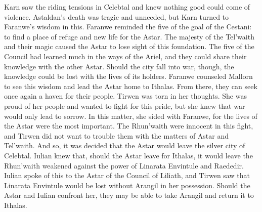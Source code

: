 \documentclass[smalldemyvopaper,11pt,twoside,onecolumn,openright,extrafontsizes]{memoir}
\begin{document}
{{Karn saw the riding tensions in Celebtal and knew nothing good could come of violence. Astaldan’s death was tragic and unneeded, but Karn turned to Faranwe’s wisdom in this. Faranwe reminded the five of the goal of the Cestani: to find a place of refuge and new life for the Astar. The majesty of the Tel’waith and their magic caused the Astar to lose sight of this foundation. The five of the Council had learned much in the ways of the Ariel, and they could share their knowledge with the other Astar. Should the city fall into war, though, the knowledge could be lost with the lives of its holders. Faranwe counseled Mallorn to see this wisdom and lead the Astar home to Ithalas. From there, they can seek once again a haven for their people.
Tirwen was torn in her thoughts. She was proud of her people and wanted to fight for this pride, but she knew that war would only lead to sorrow. In this matter, she sided with Faranwe, for the lives of the Astar were the most important. The Rhun’waith were innocent in this fight, and Tirwen did not want to trouble them with the matters of Astar and Tel’waith.
And so, it was decided that the Astar would leave the silver city of Celebtal. Iulian knew that, should the Astar leave for Ithalas, it would leave the Rhun’waith weakened against the power of Linarata Envintule and Raededir. Iulian spoke of this to the Astar of the Council of Liliath, and Tirwen saw that Linarata Envintule would be lost without Arangil in her possession. Should the Astar and Iulian confront her, they may be able to take Arangil and return it to Ithalas.

}}
\end{document}

